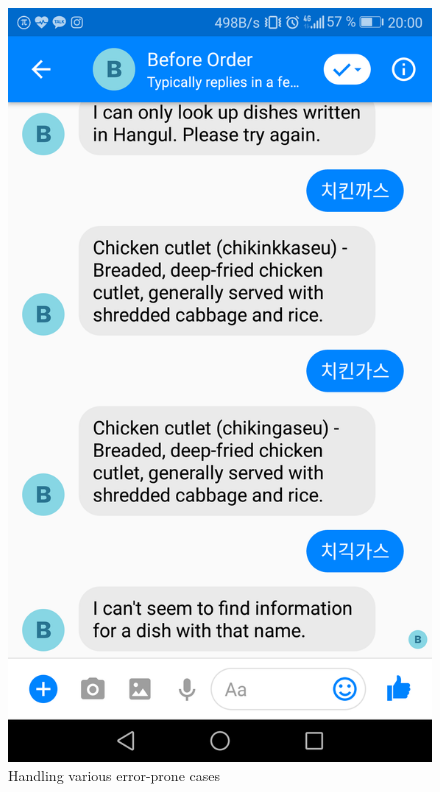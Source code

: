 \begin{figure}[htbp]
\centerline{\includegraphics[height=\custompicheight]{./pictures/facebook_different_expressions}}
\caption{Handling various error-prone cases}
\label{fig:Before Order_features}
\end{figure}
\FloatBarrier
